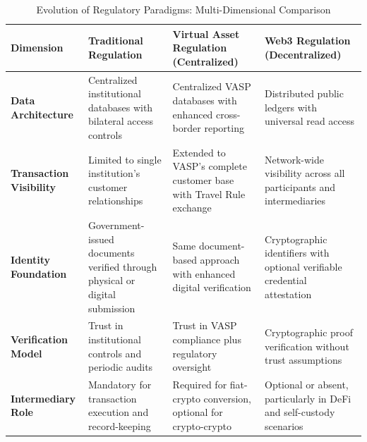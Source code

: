 \begin{table}[t]
\centering
\caption{Evolution of Regulatory Paradigms: Multi-Dimensional Comparison}
\label{tab:regulatory_evolution}
\scriptsize
\begin{tabularx}{\textwidth}{lXXX}
\toprule
\textbf{Dimension} & \textbf{Traditional Regulation} & \textbf{Virtual Asset Regulation (Centralized)} & \textbf{Web3 Regulation (Decentralized)} \\
\midrule
\textbf{Data Architecture} & Centralized institutional databases with bilateral access controls \cite{arner2016fintechregtechreconceptualization} & Centralized VASP databases with enhanced cross-border reporting \cite{force2021updatedguidanceriskbased} & Distributed public ledgers with universal read access \cite{nakamoto2008bitcoinpeertopeerelectronic,buterin2014ethereumnextgenerationsmart} \\
\midrule
\textbf{Transaction Visibility} & Limited to single institution's customer relationships \cite{zetsche2017fintechtechfinregulatory} & Extended to VASP's complete customer base with Travel Rule exchange \cite{force2021opportunitieschallengesnew} & Network-wide visibility across all participants and intermediaries \cite{meiklejohn2013fistfulbitcoinscharacterizing,reid2013analysisanonymitybitcoin} \\
\midrule
\textbf{Identity Foundation} & Government-issued documents verified through physical or digital submission \cite{financialactiontaskforcefatf2012internationalstandardscombating} & Same document-based approach with enhanced digital verification \cite{charoenwong2024regtechtechnologydrivencompliance} & Cryptographic identifiers with optional verifiable credential attestation \cite{reed2022decentralizedidentifiersdids,camenisch2001efficientsystemnontransferable} \\
\midrule
\textbf{Verification Model} & Trust in institutional controls and periodic audits \cite{arner2016fintechregtechreconceptualization} & Trust in VASP compliance plus regulatory oversight \cite{force2021updatedguidanceriskbased} & Cryptographic proof verification without trust assumptions \cite{ben-sasson2017scalablezeroknowledge,zhang2024blockchainzeroknowledge} \\
\midrule
\textbf{Intermediary Role} & Mandatory for transaction execution and record-keeping \cite{financialactiontaskforcefatf2012internationalstandardscombating} & Required for fiat-crypto conversion, optional for crypto-crypto \cite{trautman2014virtualcurrenciesbitcoin} & Optional or absent, particularly in DeFi and self-custody scenarios \cite{harvey2021defifuturefinance,qin2021attackingdefiecosystem} \\

\end{tabularx}
\end{table}
